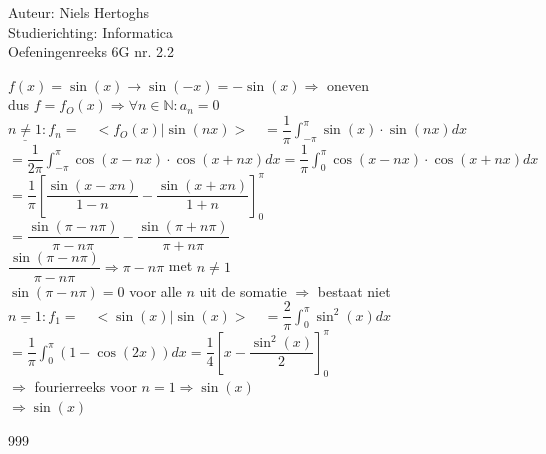 \documentclass[a4paper]{article}
\begin{document}
  
\noindent \large Auteur: Niels Hertoghs\\
\noindent \large Studierichting: Informatica\\
\noindent \large Oefeningenreeks 6G nr. 2.2\\

\medskip

\normalsize

$f(x) = \sin (x) \rightarrow \sin (-x) = - \sin (x) \Rightarrow $ oneven \\

dus $f = f_O (x) \Rightarrow \forall n \in \mathbb{N} : a_n = 0 $\\

$\underline{n \not= 1}: f_n = \quad <f_O (x) | \sin(nx)> \quad = \dfrac{1}{\pi} \displaystyle \int_{-\pi}^{\pi} \sin (x) \cdot \sin(nx) dx$\\

$ = \dfrac{1}{2\pi} \displaystyle \int_{-\pi}^{\pi} \cos (x - nx) \cdot \cos (x + nx)dx = \dfrac{1}{\pi} \displaystyle \int_{0}^{\pi} \cos (x - nx) \cdot \cos (x + nx)dx$\\

$ = \dfrac{1}{\pi} \left[ \dfrac{\sin (x-xn)}{1 - n} - \dfrac{\sin (x+xn)}{1+n} \right]_0^\pi$\\

$ = \dfrac{\sin (\pi-n\pi)}{\pi-n\pi} - \dfrac{\sin (\pi+n\pi)}{\pi+n\pi}$\\

$\dfrac{\sin (\pi-n\pi)}{\pi-n\pi} \Rightarrow \pi-n\pi$ met $ n \not= 1$\\

$\sin (\pi-n\pi) = 0$ voor alle $n$ uit de somatie $\Rightarrow$ bestaat niet\\

$\underline{n = 1}: f_1 = \quad < \sin(x) | \sin(x)> \quad = \dfrac{2}{\pi} \displaystyle \int_0^\pi \sin^2(x)dx$\\

$ = \dfrac{1}{\pi} \displaystyle \int_0^\pi \left(1-\cos(2x)\right)dx = \dfrac{1}{4} \left[x-\dfrac{\sin^2(x)}{2}\right]_0^\pi$\\

$\Rightarrow$ fourierreeks voor $n = 1 \Rightarrow \sin(x)$\\

$\Rightarrow \sin(x)$\\

 
\begin{thebibliography}{999}
\end{thebibliography}
\end{document}

